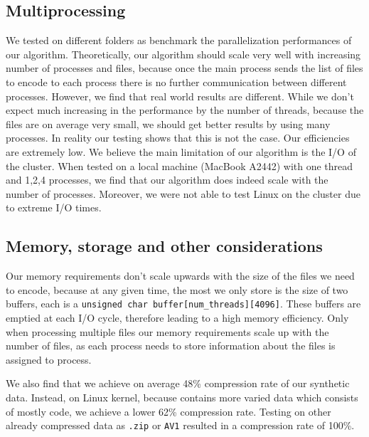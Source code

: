 \subsection{Multiprocessing}
We tested on different folders as benchmark the parallelization performances of our algorithm. Theoretically, our algorithm should scale very well with increasing number of processes and files, because once the main process sends the list of files to encode to each process there is no further communication between different processes. However, we find that real world results are different. 
While we don't expect much increasing in the performance by the number of threads, because the files are on average very small, we should get better results by using many processes.
In reality our testing shows that this is not the case. Our efficiencies are extremely low. We believe the main limitation of our algorithm is the I/O of the cluster. When tested on a local machine (MacBook A2442) with one thread and 1,2,4 processes, we find that our algorithm does indeed scale with the number of processes. Moreover, we were not able to test Linux on the cluster due to extreme I/O times.

\subsection{Memory, storage and other considerations}
Our memory requirements don't scale upwards with the size of the files we need to encode, because at any given time, the most we only store is the size of two buffers, each is a \verb|unsigned char buffer[num_threads][4096]|. These buffers are emptied at each I/O cycle, therefore leading to a high memory efficiency. Only when processing multiple files our memory requirements scale up with the number of files, as each process needs to store information about the files is assigned to process.

We also find that we achieve on average 48\% compression rate of our synthetic data. Instead, on Linux kernel, because contains more varied data which consists of mostly code, we achieve a lower 62\% compression rate. Testing on other already compressed data as \verb|.zip| or \verb|AV1| resulted in a compression rate of 100\%.
